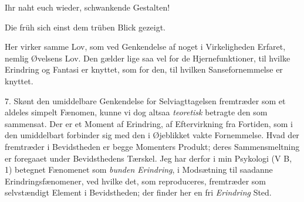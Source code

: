 \documentclass[12pt,a4paper,openany]{book}
\begin{document}
Ihr naht euch wieder, schwankende Gestalten!

Die früh sich einst dem trüben Blick gezeigt.

Her virker samme Lov, som ved Genkendelse af noget i Virkeligheden Erfaret,
nemlig Øvelsens Lov. Den gælder lige saa vel for de Hjernefunktioner, til
hvilke Erindring og Fantasi er knyttet, som for den, til hvilken
Sansefornemmelse er knyttet.

7. Skønt den umiddelbare Genkendelse for Selviagttagelsen fremtræder som et
aldeles simpelt Fænomen, kunne vi dog altsaa \emph{teoretisk} betragte den som
sammensat. Der er et Moment af Erindring, af Eftervirkning fra Fortiden, som i
den umiddelbart forbinder sig med den i Øjeblikket vakte Fornemmelse. Hvad der
fremtræder i Bevidstheden er begge Momenters Produkt; deres Sammensmeltning er
foregaaet under Bevidsthedens Tærskel. Jeg har derfor i min Psykologi (V B, 1)
betegnet Fænomenet som \emph{bunden Erindring}, i Modsætning til saadanne
Erindringsfænomener, ved hvilke det, som reproduceres, fremtræder som
selvstændigt Element i Bevidstheden; der finder her en fri \emph{Erindring} Sted.
\end{document}
